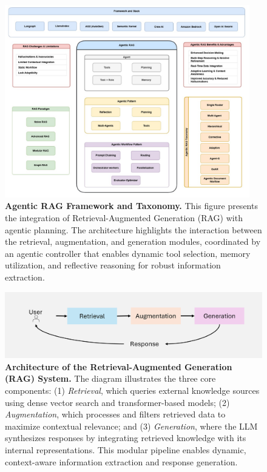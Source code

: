 \begin{figure}[h!]
    \centering
    \includegraphics[width=0.95\textwidth]{images/fig_1.jpg}
    \caption{
        \textbf{Agentic RAG Framework and Taxonomy.}
        This figure presents the integration of Retrieval-Augmented Generation (RAG) with agentic planning. The architecture highlights the interaction between the retrieval, augmentation, and generation modules, coordinated by an agentic controller that enables dynamic tool selection, memory utilization, and reflective reasoning for robust information extraction.
    }
    \label{fig:agentic_rag_architecture}
\end{figure}

\begin{figure}[h!]
    \centering
    \includegraphics[width=0.9\linewidth]{images/fig_2.png}
    \caption{
        \textbf{Architecture of the Retrieval-Augmented Generation (RAG) System.}
        The diagram illustrates the three core components: (1) \emph{Retrieval}, which queries external knowledge sources using dense vector search and transformer-based models; (2) \emph{Augmentation}, which processes and filters retrieved data to maximize contextual relevance; and (3) \emph{Generation}, where the LLM synthesizes responses by integrating retrieved knowledge with its internal representations. This modular pipeline enables dynamic, context-aware information extraction and response generation.
    }
    \label{fig:rag_architecture}
\end{figure}


